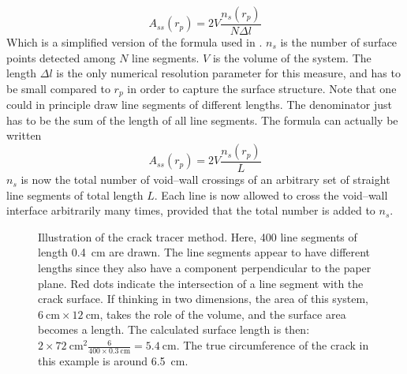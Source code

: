 \begin{equation}
A_{ss}(r_p) = 2V\frac{n_s(r_p)}{N\Delta l}
\label{eq:crack_tracer}
\end{equation}
Which is a simplified version of the formula used in \citet{Bhattacharya2009}. $n_s$ is the number of surface points detected among $N$ line segments. $V$ is the volume of the system. The length $\Delta l$ is the only numerical resolution parameter for this measure, and has to be small compared to $r_p$ in order to capture the surface structure. Note that one could in principle draw line segments of different lengths. The denominator just has to be the sum of the length of all line segments. The formula can actually be written
\begin{equation}
	A_{ss}(r_p) = 2V\frac{n_s(r_p)}{L}
\end{equation}
$n_s$ is now the total number of void--wall crossings of an arbitrary set of straight line segments of total length $L$. Each line is now allowed to cross the void--wall interface arbitrarily many times, provided that the total number is added to $n_s$.

\begin{figure}
\centering
{}
\caption{Illustration of the crack tracer method. Here, 400 line segments of length \SI{0.4}{\centi\meter} are drawn. The line segments appear to have different lengths since they also have a component perpendicular to the paper plane. Red dots indicate the intersection of a line segment with the crack surface.  If thinking in two dimensions, the area of this system, $\SI{6}{\centi\meter} \times \SI{12}{\centi\meter}$, takes the role of the volume, and the surface area becomes a length. The calculated surface length is then: $2\times \SI{72}{\centi\meter\squared} \frac{6}{400\times \SI{0.3}{\centi\meter}} = \SI{5.4}{\centi\meter}$. The true circumference of the crack in this example is around \SI{6.5}{\centi\meter}.}
\label{fig:crack_tracer_method}
\end{figure}

